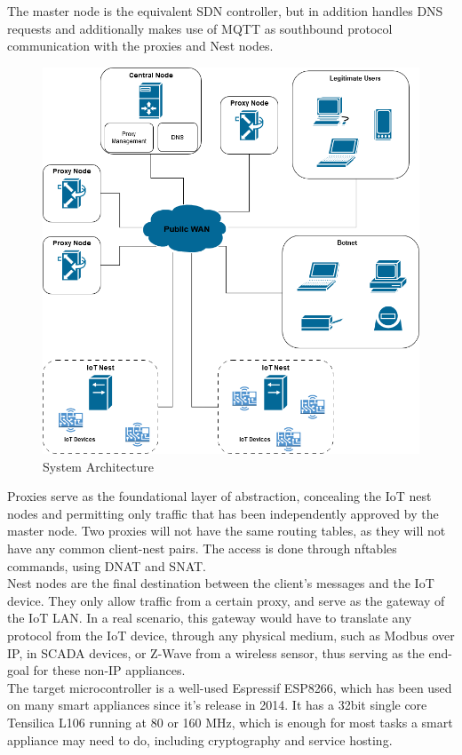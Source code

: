 \documentclass[conference]{IEEEtran}
\begin{document}
The master node is the equivalent SDN controller, but in addition handles DNS requests and additionally makes use of MQTT as southbound protocol communication with the proxies and Nest nodes.

\begin{figure}
    \centering
    \includegraphics[width=1\linewidth]{images/architecture.png}
    \caption{System Architecture}
\end{figure}

Proxies serve as the foundational layer of abstraction, concealing the IoT nest nodes and permitting only traffic that has been independently approved by the master node. Two proxies will not have the same routing tables, as they will not have any common client-nest pairs. The access is done through nftables commands, using DNAT and SNAT.\\
Nest nodes are the final destination between the client's messages and the IoT device. They only allow traffic from a certain proxy, and serve as the gateway of the IoT LAN. In a real scenario, this gateway would have to translate any protocol from the IoT device, through any physical medium, such as Modbus over IP, in SCADA devices, or Z-Wave from a wireless sensor, thus serving as the end-goal for these non-IP appliances.
\\
The target microcontroller is a well-used Espressif ESP8266, which has been used on many smart appliances since it’s release in 2014. It has a 32bit single core Tensilica L106 running at 80 or 160 MHz, which is enough for most tasks a smart appliance may need to do, including cryptography and service hosting. 
\end{document}
